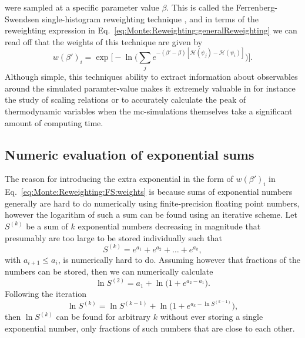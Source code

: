 were sampled at a specific parameter value $\beta$. This is called the Ferrenberg-Swendsen single-histogram reweighting technique \cite{FS_1988}, and in terms of the reweighting
expression in Eq.~\eqref{eq:Monte:Reweighting:generalReweighting} we can read off that the weights of this technique are given by
\begin{equation}
    \label{eq:Monte:Reweighting:FS:weights}
    w(\beta')_i = \exp\Big[-\ln\Big(\sum_je^{-(\beta'-\beta)[\mathcal{H}(\psi_j)-\mathcal{H}(\psi_i)]}\Big)\Big].
\end{equation}
Although simple, this techniques ability to extract information about observables around the simulated paramter-value makes it extremely valuable 
in for instance the study of scaling relations or to accurately calculate the peak of thermodynamic variables when the \ac{mc}-simulations themselves take a significant
amount of computing time.

\subsection{Numeric evaluation of exponential sums}
\label{sec:Monte:Reweighting:expSums}

The reason for introducing the extra exponential in the form of $w(\beta')_i$ in Eq.~\eqref{eq:Monte:Reweighting:FS:weights} is because sums of exponential
numbers generally are hard to do numerically using finite-precision
floating point numbers, however the logarithm of such a sum can be found using an iterative scheme. Let $S^{(k)}$ be a sum of $k$
exponential numbers decreasing in magnitude that presumably are too large to be stored individually such that
\begin{equation}
    \label{eq:Monte:Reweighting:FS:expSum}
    S^{(k)} = e^{a_1} + e^{a_2} + \ldots + e^{a_k},
\end{equation}
with $a_{i+1}\leq a_i$, is numerically hard to do. Assuming however that fractions of the numbers can be stored, then we can numerically calculate
\begin{equation}
    \label{eq:Monte:Reweighting:FS:initialLnSum}
    \ln S^{(2)} = a_1 + \ln\Big(1+e^{a_2-a_1}\Big).
\end{equation}
Following the iteration
\begin{equation}
    \label{eq:Monte:Reweighting:FS:iteratedLnSum}
    \ln S^{(k)} = \ln S^{(k-1)} + \ln\Big(1+e^{a_k-\ln S^{(k-1)}}\Big),
\end{equation}
then $\ln S^{(k)}$ can be found for arbitrary $k$ without ever storing a single exponential number, only fractions of such numbers that are close to each other.

